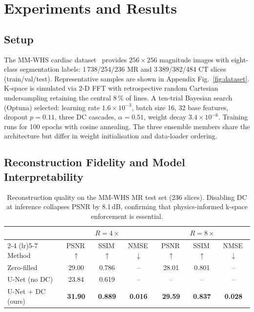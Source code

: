 \documentclass[runningheads]{llncs}
\begin{document}
\section{Experiments and Results}\label{sec:results}

\subsection{Setup}
The MM-WHS cardiac dataset~\cite{zhuang2019mmwhs} provides $256{\times}256$ magnitude images with eight-class segmentation labels: 1\,738/254/236 MR and 3\,389/382/484 CT slices (train/val/test). Representative samples are shown in Appendix Fig.~\ref{fig:dataset}. K-space is simulated via 2-D FFT with retrospective random Cartesian undersampling retaining the central 8\,\% of lines. A ten-trial Bayesian search (Optuna) selected: learning rate $1.6{\times}10^{-3}$, batch size 16, 32 base features, dropout $p{=}0.11$, three DC cascades, $\alpha{=}0.51$, weight decay $3.4{\times}10^{-6}$. Training runs for 100 epochs with cosine annealing. The three ensemble members share the architecture but differ in weight initialisation and data-loader ordering.

\subsection{Reconstruction Fidelity and Model Interpretability}

\begin{table}[t]
\caption{Reconstruction quality on the MM-WHS MR test set (236 slices). Disabling DC at inference collapses PSNR by 8.1\,dB, confirming that physics-informed k-space enforcement is essential.}\label{tab:recon}
\centering\footnotesize
\setlength{\tabcolsep}{5pt}
\begin{tabular}{l ccc ccc}
\toprule
& \multicolumn{3}{c}{$R{=}4\times$} & \multicolumn{3}{c}{$R{=}8\times$} \\
\cmidrule(lr){2-4} \cmidrule(lr){5-7}
Method & PSNR\,$\uparrow$ & SSIM\,$\uparrow$ & NMSE\,$\downarrow$ & PSNR\,$\uparrow$ & SSIM\,$\uparrow$ & NMSE\,$\downarrow$ \\
\midrule
Zero-filled        & 29.00 & 0.786 & --    & 28.01 & 0.801 & --    \\
U-Net (no DC)      & 23.84 & 0.619 & --    & --    & --    & --    \\
U-Net + DC (ours)  & \textbf{31.90} & \textbf{0.889} & \textbf{0.016} & \textbf{29.59} & \textbf{0.837} & \textbf{0.028} \\
\bottomrule
\end{tabular}
\end{table}
\end{document}
